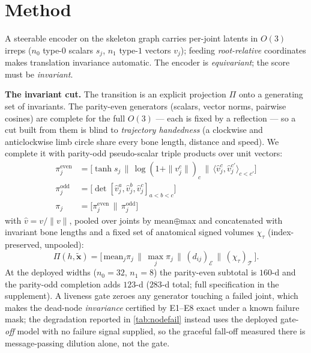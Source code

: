 \documentclass[10pt,twocolumn,letterpaper]{article}
\begin{document}
\section{Method}\label{sec:method}
A steerable encoder on the skeleton graph carries per-joint latents in $O(3)$ irreps ($n_0$ type-$0$
scalars $s_j$, $n_1$ type-$1$ vectors $v_j$); feeding \emph{root-relative} coordinates makes
translation invariance automatic. The encoder is \emph{equivariant}; the score must be \emph{invariant}.

\textbf{The invariant cut.} The transition is an explicit projection $\Pi$ onto a generating set of
invariants. The parity-even generators (scalars, vector norms, pairwise cosines) are complete for the
full $O(3)$ --- each is fixed by a reflection --- so a cut built from them is blind to \emph{trajectory
handedness} (a clockwise and anticlockwise limb circle share every bone length, distance and speed). We
complete it with parity-odd pseudo-scalar triple products over unit vectors:
\begin{align}
\pi_j^{\mathrm{even}} &= \Big[\tanh s_j \,\|\, \log(1{+}\|v_j^{c}\|)_c \,\|\,
  \langle\hat v_j^{c},\hat v_j^{c'}\rangle_{c<c'}\Big] \label{eq:cut-even}\\
\pi_j^{\mathrm{odd}} &= \Big[\det[\hat v_j^{a},\hat v_j^{b},\hat v_j^{c}]_{a<b<c}\Big]
  \label{eq:cut-odd}\\
\pi_j &= \big[\pi_j^{\mathrm{even}} \,\|\, \pi_j^{\mathrm{odd}}\big] \label{eq:cut}
\end{align}
with $\hat v=v/\|v\|$, pooled over joints by mean$\oplus$max and concatenated with invariant bone
lengths and a fixed set of anatomical signed volumes $\chi_\tau$ (index-preserved, unpooled):
\begin{equation}\label{eq:pi}
\Pi(h,\tilde{\bm{x}})=\big[\,\mathrm{mean}_j\pi_j \,\|\, \max_j\pi_j \,\|\, (d_{ij})_{\mathcal{E}} \,\|\, (\chi_\tau)_{\mathcal{T}}\,\big].
\end{equation}
At the deployed widths ($n_0{=}32$, $n_1{=}8$) the parity-even subtotal is $160$-d and the parity-odd
completion adds $123$-d ($283$-d total; full specification in the supplement). A liveness gate zeroes
any generator touching a failed joint, which makes the dead-node \emph{invariance} certified by E1--E8
exact under a known failure mask; the degradation reported in \cref{tab:nodefail} instead uses the
deployed gate-\emph{off} model with no failure signal supplied, so the graceful fall-off measured there
is message-passing dilution alone, not the gate.
\end{document}
